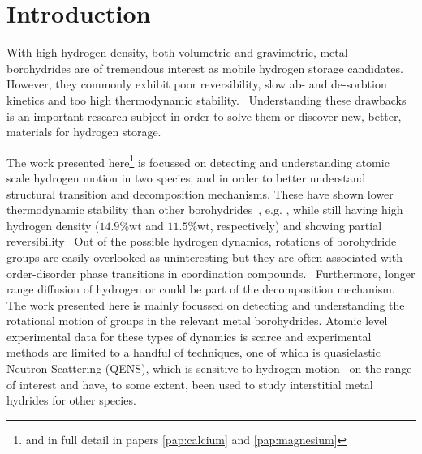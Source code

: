 \section{Introduction}
\label{sec:borohydrides-introduction}


With high hydrogen density, both volumetric and gravimetric, metal borohydrides are of tremendous interest as mobile hydrogen storage candidates.
However, they commonly exhibit poor reversibility, slow ab- and de-sorbtion kinetics and too high thermodynamic stability.~\cite{lithium-stability-2003, borohydride-stability-2006, calcium-stability-2006}
Understanding these drawbacks is an important research subject in order to solve them or discover new, better, materials for hydrogen storage.

The work presented here\footnote{and in full detail in papers \ref{pap:calcium} and \ref{pap:magnesium}} is focussed on detecting and understanding atomic scale hydrogen motion in two species,  and  in order to better understand structural transition and decomposition mechanisms.
These have shown lower thermodynamic stability than other borohydrides~\cite{borohydride-stability-2006, calcium-stability-2006}, e.g. , while still having high hydrogen density ($14.9\%\text{wt}$ and $11.5\%\text{wt}$, respectively) and showing partial reversibility~\cite{magnesium-reversibility-severa-2010, magnesium-reversibility-chong-2011, calcium-reversibility-2007, calcium-reversibility-2008, reversibility-destabilisation-2008}
Out of the possible hydrogen dynamics, rotations of borohydride groups are easily overlooked as uninteresting but they are often associated with order-disorder phase transitions in coordination compounds.~\cite{order-disorder-2006, order-disorder-2010}
Furthermore, longer range diffusion of hydrogen or  could be part of the decomposition mechanism.
The work presented here is mainly focussed on detecting and understanding the rotational motion of  groups in the relevant metal borohydrides.
Atomic level experimental data for these types of dynamics is scarce and experimental methods are limited to a handful of techniques, one of which is quasielastic Neutron Scattering (QENS), which is sensitive to hydrogen motion~\cite{qens-bee-1988} on the range of interest and have, to some extent, been used to study interstitial metal hydrides for other species.~\citemiss

